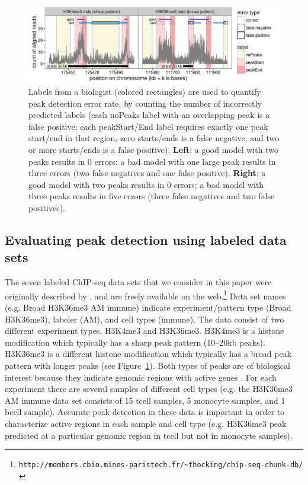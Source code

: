 \documentclass[twoside,11pt]{article}
\begin{document}
\begin{figure}[t!]
  \centering
  \includegraphics[width=\textwidth]{figure-good-bad}
\vskip -0.5cm
\caption{Labels from a biologist (colored rectangles) are used to 
  quantify peak detection error rate, by counting the
  number of incorrectly predicted labels
  (each noPeaks label with an overlapping
  peak is a false positive; each peakStart/End label requires exactly
  one peak start/end in that region, zero starts/ends is a false
  negative, and two or more starts/ends is a false positive).
  \textbf{Left}: a \textcolor{good}{good} model with two peaks results in 0 errors; a
  \textcolor{bad}{bad} model with one large peak results in three errors (two false negatives and one false positive).
  \textbf{Right}: a \textcolor{good}{good} model with two peaks results in 0 errors; a
  \textcolor{bad}{bad} model with three peaks results in five errors (three false negatives and two false positives).
}
  \label{fig:good-bad}
\end{figure}


\subsection{Evaluating peak detection using labeled data sets}

The seven labeled ChIP-seq data sets that we consider in this paper were originally
described by \citet{HOCKING2016-chipseq}, and are freely available on
the
web.\footnote{\verb|http://members.cbio.mines-paristech.fr/~thocking/chip-seq-chunk-db/|}
Data set names (e.g. Broad H3K36me3 AM immune) indicate
experiment/pattern type (Broad H3K36me3), labeler (AM), and cell types
(immune). The data consist of two different experiment types, H3K4me3
and H3K36me3. H3K4me3 is a histone modification which typically has a
sharp peak pattern (10--20kb peaks). H3K36me3 is a different histone
modification which typically has a broad peak pattern with longer
peaks (see Figure~\ref{fig:good-bad}). Both types of peaks are of
biological interest because they indicate genomic regions with active
genes \citep{histone-review}. For each experiment there are several samples of different
cell types (e.g. the H3K36me3 AM immune data set consists of 15 tcell
samples, 5 monocyte samples, and 1 bcell sample). Accurate peak
detection in these data is important in order to characterize active
regions in each sample and cell type (e.g. H3K36me3 peak predicted at
a particular genomic region in tcell but not in monocyte samples).
\end{document}
